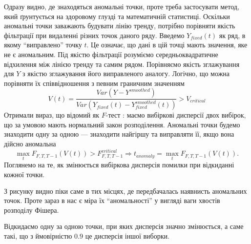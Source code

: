 Одразу видно, де знаходяться аномальні точки,
проте треба застосувати метод,
який ґрунтується на здоровому глузді
та математичній статистиці.
Оскільки аномальні точки заважають будувати лінію тренду,
потрібно порівняти якість фільтрації при видаленні різних точок даного ряду.
Введемо $Y_{fixed}\left( t \right)$ як ряд, в якому ``виправлено'' точку $t$.
Це означає, що дані в цій точці мають значення, яке не є аномальним.
Під якістю фільтрації розуміємо середньоквадратичне відхилення
між лінією тренду та самим рядом.
Порівняємо якість зглажування для $Y$
з якістю зглажування його виправленого аналогу.
Логічно, що можна порівняти їх співвідношення з певним граничним значенням
\begin{equation*}
  V\left( t \right)
  = \frac{Var\left( Y - Y^{smoothed} \right)}
         {Var\left( Y_{fixed}\left(t\right)
                    - Y_{fixed}^{smoothed}\left(t\right) \right)}
  > V_{critical}
\end{equation*}
Отримали вираз, що відомий як $F$-тест \cite{lomax2007statistical}:
маємо вибіркові дисперсії двох вибірок,
що за умовою мають нормальний закон розподілення.
Аномальні точки будемо знаходити одну за одною ---
знаходити найгіршу та виправляти її,
якщо вона дійсно аномальна
\begin{equation*}
  \max\limits_{t}{F_{F, T, T-1}\left( V\left( t \right) \right)}
    > F_{F, T, T-1}^{critical}
  \Longrightarrow
  t_{anomaly} = \max\limits_{t}{F_{F, T, T-1}\left( V\left( t \right) \right)}.
\end{equation*}
Поглянемо на те, як змінюється вибіркова дисперсія помилки
при відкиданні кожної точки.
\begin{center}
\end{center}

З рисунку видно піки саме в тих місцях,
де передбачалась наявнисть аномальних точок.
Проте зараз в нас є міра їх ``аномальності''
у вигляді ваги хвостів розподілу Фішера.
\begin{center}
\end{center}

Відкидаємо одну за одною точки, при яких дисперсія значно змінюється,
а саме такі, що з ймовірністю $0.9$ це дисперсія іншої виборки.

\begin{center}
\end{center}


